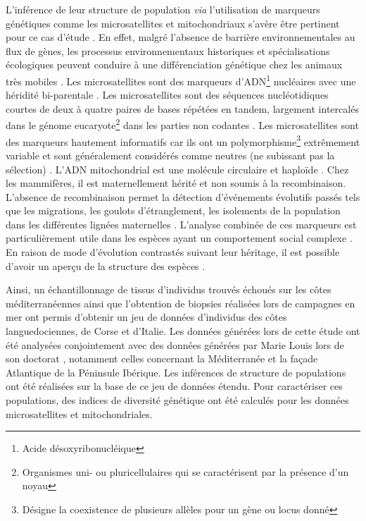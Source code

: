 \documentclass[a4paper,12pt,twoside]{article}\usepackage[]{graphicx}\usepackage[]{color}
\begin{document}
L'inférence de leur structure de population \emph{via} l'utilisation de marqueurs génétiques comme les microsatellites et mitochondriaux s'avère être pertinent pour ce cas d'étude \citep{natoli2004molecular}. En effet, malgré l'absence de barrière environnementales au flux de gènes, les processus environnementaux historiques et spécialisations écologiques peuvent conduire à une différenciation génétique chez les animaux très mobiles \citep{natoli2005habitat, louis2014}. Les microsatellites sont des marqueurs d'ADN\footnote{Acide désoxyribonucléique} nucléaires avec une héridité bi-parentale \citep{jarne1996microsatellites}. Les microsatellites sont des séquences nucléotidiques courtes de deux à quatre paires de bases répétées en tandem, largement intercalés dans le génome eucaryote\footnote{Organismes uni- ou pluricellulaires qui se caractérisent par la présence d'un noyau} dans les parties non codantes \citep{estoup2002homoplasy}. Les microsatellites sont des marqueurs hautement informatifs car ils ont un polymorphisme\footnote{Désigne la coexistence de plusieurs allèles pour un gène ou locus donné} extrêmement variable et sont généralement considérés comme neutres (ne subissant pas la sélection) \citep{jarne1996microsatellites}. L'ADN mitochondrial est une molécule circulaire et haploïde \citep{avise1987intraspecific}. Chez les mammifères, il est maternellement hérité et non soumis à la recombinaison. L'absence de recombinaison permet la détection d'événements évolutifs passés tels que les migrations, les goulots d'étranglement, les isolements de la population dans les différentes lignées maternelles \citep{avise1987intraspecific, excoffier1992analysis}. L'analyse combinée de ces marqueurs est particulièrement utile dans les espèces ayant un comportement social complexe \citep{natoli2004molecular}. En raison de mode d'évolution contrastés suivant leur héritage, il est possible d'avoir un aperçu de la structure des espèces \citep{natoli2005habitat}.

Ainsi, un échantillonnage de tissus d'individus trouvés échoués sur les côtes méditerranéennes ainsi que l'obtention de biopsies réalisées lors de campagnes en mer ont permis d'obtenir un jeu de données d'individus des côtes languedociennes, de Corse et d’Italie. Les données générées lors de cette étude ont été analysées conjointement avec des données générées par Marie Louis lors de son doctorat \citep{phdLouis2014}, notamment celles concernant la Méditerranée et la façade Atlantique de la Péninsule Ibérique. Les inférences de structure de populations ont été réalisées sur la base de ce jeu de données étendu. Pour caractériser ces populations, des indices de diversité génétique ont été calculés pour les données microsatellites et mitochondriales.
\end{document}
